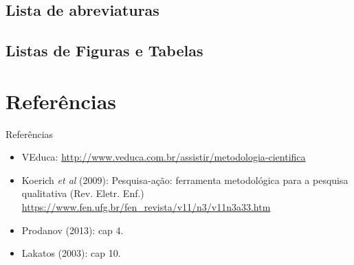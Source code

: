 \documentclass{beamer}
\begin{document}
\subsection{Lista de abreviaturas}

\subsection{Listas de Figuras e Tabelas}



\section{Referências}

\begin{frame}{Referências}
  \begin{itemize}
  \item<1-> VEduca:
    \url{http://www.veduca.com.br/assistir/metodologia-cientifica}
  \item<1-> Koerich {\em et al} (2009): Pesquisa-ação: ferramenta
    metodológica para a pesquisa qualitativa (Rev. Eletr. Enf.)
    \url{https://www.fen.ufg.br/fen_revista/v11/n3/v11n3a33.htm}
  \item<1-> Prodanov (2013): cap 4.
  \item<1-> Lakatos (2003): cap 10.
  \end{itemize}
\end{frame}
\end{document}
